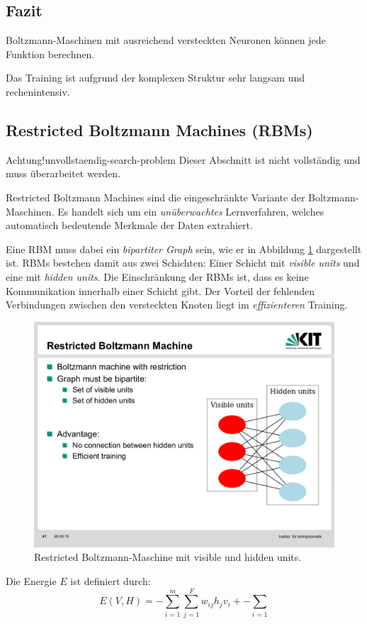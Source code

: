 \subsection*{Fazit}
Boltzmann-Maschinen mit ausreichend versteckten Neuronen können jede Funktion berechnen.

Das Training ist aufgrund der komplexen Struktur sehr langsam und rechenintensiv.




\subsection*{Restricted Boltzmann Machines (RBMs)}
\begin{hint}{Achtung!}{unvollstaendig-search-problem}
	Dieser Abschnitt ist nicht vollständig und muss überarbeitet werden.
\end{hint}
Restricted Boltzmann Machines sind die eingeschränkte Variante der Boltzmann-Maschinen. Es handelt sich um ein \emph{unüberwachtes} Lernverfahren, welches automatisch bedeutende Merkmale der Daten extrahiert.

Eine RBM muss dabei ein \emph{bipartiter Graph} sein, wie er in Abbildung \ref{fig:ch10_rbms-bipartiter-graph} dargestellt ist. RBMs bestehen damit aus zwei Schichten: Einer Schicht mit \emph{visible units} und eine mit \emph{hidden units}. 
Die Einschränkung der RBMs ist, dass es keine Kommunikation innerhalb einer Schicht gibt.
Der Vorteil der fehlenden Verbindungen zwischen den versteckten Knoten liegt im \emph{effizienteren} Training.

\begin{figure}[ht!] \centering 
	\includegraphics[width=0.5\linewidth]{figures/ch10_rbms-bipartiter-graph.pdf}
	\caption{Restricted Boltzmann-Maschine mit visible und hidden units.}
	\label{fig:ch10_rbms-bipartiter-graph}
\end{figure}

Die Energie $E$ ist definiert durch:
\[
	E(V,H) = - \sum_{i=1}^{m} \sum_{j=1}^{F} w_{ij} h_j v_i + 
		- \sum_{i=1}
\]
